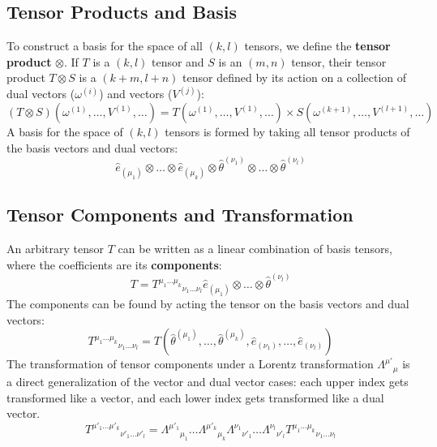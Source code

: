\documentclass[11pt, a4paper]{report}
\begin{document}
\subsection*{Tensor Products and Basis}

To construct a basis for the space of all $(k,l)$ tensors, we define the \textbf{tensor product} $\otimes$. If $T$ is a $(k,l)$ tensor and $S$ is an $(m,n)$ tensor, their tensor product $T \otimes S$ is a $(k+m, l+n)$ tensor defined by its action on a collection of dual vectors ($\omega^{(i)}$) and vectors ($V^{(j)}$):
\begin{equation}
    (T \otimes S)(\omega^{(1)}, \dots, V^{(1)}, \dots) = T(\omega^{(1)}, \dots, V^{(1)}, \dots) \times S(\omega^{(k+1)}, \dots, V^{(l+1)}, \dots)
\end{equation}
A basis for the space of $(k,l)$ tensors is formed by taking all tensor products of the basis vectors and dual vectors:
\begin{equation}
    \hat{e}_{(\mu_1)} \otimes \dots \otimes \hat{e}_{(\mu_k)} \otimes \hat{\theta}^{(\nu_1)} \otimes \dots \otimes \hat{\theta}^{(\nu_l)}
\end{equation}

\subsection*{Tensor Components and Transformation}

An arbitrary tensor $T$ can be written as a linear combination of basis tensors, where the coefficients are its \textbf{components}:
\begin{equation}
    T = {T^{\mu_1 \dots \mu_k}}_{\nu_1 \dots \nu_l} \hat{e}_{(\mu_1)} \otimes \dots \otimes \hat{\theta}^{(\nu_l)}
\end{equation}
The components can be found by acting the tensor on the basis vectors and dual vectors:
\begin{equation}
    {T^{\mu_1 \dots \mu_k}}_{\nu_1 \dots \nu_l} = T(\hat{\theta}^{(\mu_1)}, \dots, \hat{\theta}^{(\mu_k)}, \hat{e}_{(\nu_1)}, \dots, \hat{e}_{(\nu_l)})
\end{equation}
The transformation of tensor components under a Lorentz transformation ${\Lambda^{\mu'}}_{\mu}$ is a direct generalization of the vector and dual vector cases: each upper index gets transformed like a vector, and each lower index gets transformed like a dual vector.
\begin{equation}
    {T^{\mu'_1 \dots \mu'_k}}_{\nu'_1 \dots \nu'_l} = {\Lambda^{\mu'_1}}_{\mu_1} \dots {\Lambda^{\mu'_k}}_{\mu_k} {\Lambda^{\nu_1}}_{\nu'_1} \dots {\Lambda^{\nu_l}}_{\nu'_l} {T^{\mu_1 \dots \mu_k}}_{\nu_1 \dots \nu_l}
\end{equation}
\end{document}
